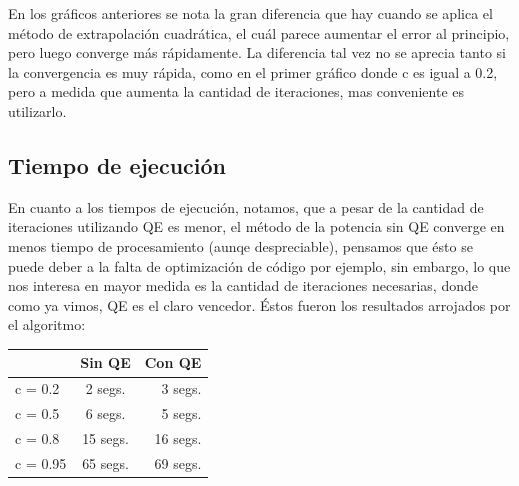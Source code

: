 En los gr\'aficos anteriores se nota la gran diferencia que hay cuando se aplica el m\'etodo de extrapolaci\'on cuadr\'atica, el cu\'al parece aumentar el error al principio, pero luego converge m\'as r\'apidamente. La diferencia tal vez no se aprecia tanto si la convergencia es muy r\'apida, como en el primer gr\'afico donde c es igual a 0.2, pero a medida que aumenta la cantidad de iteraciones, mas conveniente es utilizarlo.\\


\subsection{Tiempo de ejecuci\'on}

En cuanto a los tiempos de ejecuci\'on, notamos, que a pesar de la cantidad de iteraciones utilizando QE es menor, el m\'etodo de la potencia sin QE converge en menos tiempo de procesamiento (aunqe despreciable), pensamos que \'esto se puede deber a la falta de optimizaci\'on de c\'odigo por ejemplo, sin embargo, lo que nos interesa en mayor medida es la cantidad de iteraciones necesarias, donde como ya vimos, QE es el claro vencedor. 
\'Estos fueron los resultados arrojados por el algoritmo: \\

\begin{tabular}{ l | c | r}
  & Sin QE & Con QE\\
  \hline
  c = 0.2 & 2 segs. & 3 segs.\\
  \hline
  c = 0.5 & 6 segs. & 5 segs.\\
  \hline
  c = 0.8 & 15 segs. & 16 segs. \\
  \hline
  c = 0.95 & 65 segs. & 69 segs. \\
  \hline
\end{tabular}

